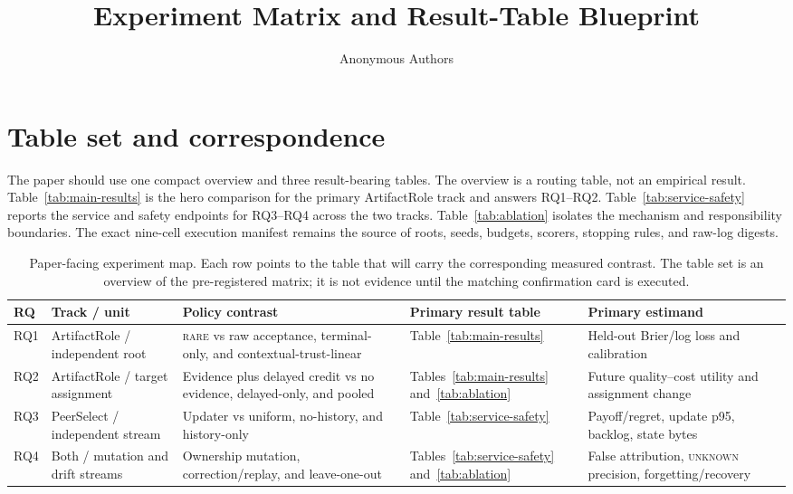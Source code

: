 \documentclass[sigconf,anonymous]{aamas}
\title[Experiment Matrix Blueprint]{Experiment Matrix and Result-Table Blueprint}
\author{Anonymous Authors}
\affiliation{\institution{Internal research draft}}
\newcommand{\unknown}{\textsc{unknown}}
\newcommand{\rare}{\textsc{rare}}
\begin{document}
\maketitle

\section{Table set and correspondence}

The paper should use one compact overview and three result-bearing tables. The overview is a routing table, not an empirical result. Table~\ref{tab:main-results} is the hero comparison for the primary ArtifactRole track and answers RQ1--RQ2. Table~\ref{tab:service-safety} reports the service and safety endpoints for RQ3--RQ4 across the two tracks. Table~\ref{tab:ablation} isolates the mechanism and responsibility boundaries. The exact nine-cell execution manifest remains the source of roots, seeds, budgets, scorers, stopping rules, and raw-log digests.

\begin{table}[t]
\centering
\small
\setlength{\tabcolsep}{3.5pt}
\renewcommand{\arraystretch}{1.12}
\begin{tabular}{p{}p{}p{}p{}p{}}
\toprule
RQ & Track / unit & Policy contrast & Primary result table & Primary estimand\\
\midrule
RQ1 & ArtifactRole / independent root & \rare{} vs raw acceptance, terminal-only, and contextual-trust-linear & Table~\ref{tab:main-results} & Held-out Brier/log loss and calibration\\
RQ2 & ArtifactRole / target assignment & Evidence plus delayed credit vs no evidence, delayed-only, and pooled & Tables~\ref{tab:main-results} and~\ref{tab:ablation} & Future quality--cost utility and assignment change\\
RQ3 & PeerSelect / independent stream & Updater vs uniform, no-history, and history-only & Table~\ref{tab:service-safety} & Payoff/regret, update p95, backlog, state bytes\\
RQ4 & Both / mutation and drift streams & Ownership mutation, correction/replay, and leave-one-out & Tables~\ref{tab:service-safety} and~\ref{tab:ablation} & False attribution, \unknown{} precision, forgetting/recovery\\
\bottomrule
\end{tabular}
\caption{Paper-facing experiment map. Each row points to the table that will carry the corresponding measured contrast. The table set is an overview of the pre-registered matrix; it is not evidence until the matching confirmation card is executed.}
\label{tab:overview}
\end{table}
\end{document}
